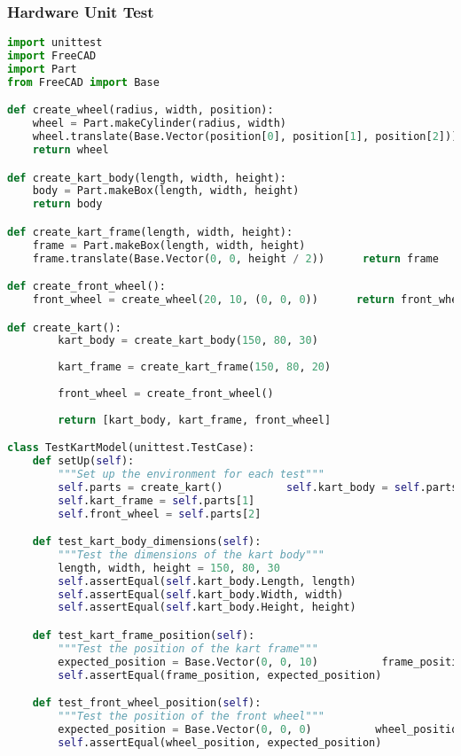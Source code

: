 \documentclass[a4paper,12pt]{article}
\begin{document}
\subsubsection{Hardware Unit Test}
\begin{lstlisting}[language=Python]
import unittest
import FreeCAD
import Part
from FreeCAD import Base

def create_wheel(radius, width, position):
    wheel = Part.makeCylinder(radius, width)
    wheel.translate(Base.Vector(position[0], position[1], position[2]))
    return wheel

def create_kart_body(length, width, height):
    body = Part.makeBox(length, width, height)
    return body

def create_kart_frame(length, width, height):
    frame = Part.makeBox(length, width, height)
    frame.translate(Base.Vector(0, 0, height / 2))      return frame

def create_front_wheel():
    front_wheel = create_wheel(20, 10, (0, 0, 0))      return front_wheel

def create_kart():
        kart_body = create_kart_body(150, 80, 30)
    
        kart_frame = create_kart_frame(150, 80, 20)
    
        front_wheel = create_front_wheel()
    
        return [kart_body, kart_frame, front_wheel]

class TestKartModel(unittest.TestCase):
    def setUp(self):
        """Set up the environment for each test"""
        self.parts = create_kart()          self.kart_body = self.parts[0]
        self.kart_frame = self.parts[1]
        self.front_wheel = self.parts[2]

    def test_kart_body_dimensions(self):
        """Test the dimensions of the kart body"""
        length, width, height = 150, 80, 30
        self.assertEqual(self.kart_body.Length, length)
        self.assertEqual(self.kart_body.Width, width)
        self.assertEqual(self.kart_body.Height, height)

    def test_kart_frame_position(self):
        """Test the position of the kart frame"""
        expected_position = Base.Vector(0, 0, 10)          frame_position = self.kart_frame.CenterOfMass
        self.assertEqual(frame_position, expected_position)

    def test_front_wheel_position(self):
        """Test the position of the front wheel"""
        expected_position = Base.Vector(0, 0, 0)          wheel_position = self.front_wheel.CenterOfMass
        self.assertEqual(wheel_position, expected_position)


\end{lstlisting}
\end{document}
